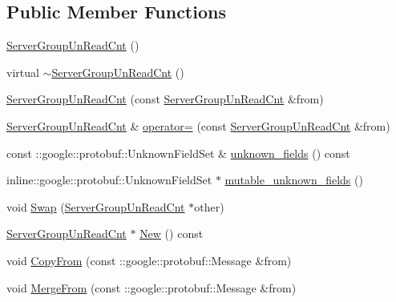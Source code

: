 \subsection*{Public Member Functions}
\begin{DoxyCompactItemize}
\item 
\hyperlink{class_i_m_1_1_base_define_1_1_server_group_un_read_cnt_acd69882c99e50f1815f7e08341a9ff64}{Server\+Group\+Un\+Read\+Cnt} ()
\item 
virtual \hyperlink{class_i_m_1_1_base_define_1_1_server_group_un_read_cnt_af750671434b2527d51749721af6a7e9f}{$\sim$\+Server\+Group\+Un\+Read\+Cnt} ()
\item 
\hyperlink{class_i_m_1_1_base_define_1_1_server_group_un_read_cnt_a506f83d63b0a7e608890a42737ca3f0b}{Server\+Group\+Un\+Read\+Cnt} (const \hyperlink{class_i_m_1_1_base_define_1_1_server_group_un_read_cnt}{Server\+Group\+Un\+Read\+Cnt} \&from)
\item 
\hyperlink{class_i_m_1_1_base_define_1_1_server_group_un_read_cnt}{Server\+Group\+Un\+Read\+Cnt} \& \hyperlink{class_i_m_1_1_base_define_1_1_server_group_un_read_cnt_a69e6ff0e5cf1aa151fa3459763f73646}{operator=} (const \hyperlink{class_i_m_1_1_base_define_1_1_server_group_un_read_cnt}{Server\+Group\+Un\+Read\+Cnt} \&from)
\item 
const \+::google\+::protobuf\+::\+Unknown\+Field\+Set \& \hyperlink{class_i_m_1_1_base_define_1_1_server_group_un_read_cnt_a4a48e6edf546d8e731cac0ff58d30dae}{unknown\+\_\+fields} () const 
\item 
inline\+::google\+::protobuf\+::\+Unknown\+Field\+Set $\ast$ \hyperlink{class_i_m_1_1_base_define_1_1_server_group_un_read_cnt_ac964ef34fd4eb29f4721403f3c6338c1}{mutable\+\_\+unknown\+\_\+fields} ()
\item 
void \hyperlink{class_i_m_1_1_base_define_1_1_server_group_un_read_cnt_a9ae7c711baf33e2f26ab3934d0c4f636}{Swap} (\hyperlink{class_i_m_1_1_base_define_1_1_server_group_un_read_cnt}{Server\+Group\+Un\+Read\+Cnt} $\ast$other)
\item 
\hyperlink{class_i_m_1_1_base_define_1_1_server_group_un_read_cnt}{Server\+Group\+Un\+Read\+Cnt} $\ast$ \hyperlink{class_i_m_1_1_base_define_1_1_server_group_un_read_cnt_acf8e9fb63ce43e8eef6c2c871fe8b1fe}{New} () const 
\item 
void \hyperlink{class_i_m_1_1_base_define_1_1_server_group_un_read_cnt_a7e9a701fc7850b5639e5ae9fc976d0f1}{Copy\+From} (const \+::google\+::protobuf\+::\+Message \&from)
\item 
void \hyperlink{class_i_m_1_1_base_define_1_1_server_group_un_read_cnt_a9977ef6a084b98f02ebe16321d4bedfd}{Merge\+From} (const \+::google\+::protobuf\+::\+Message \&from)

\end{DoxyCompactItemize}
